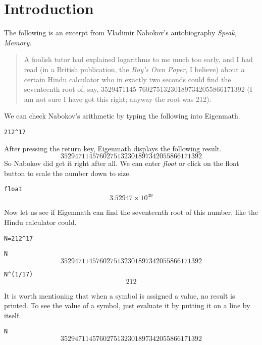 \section{Introduction}

\noindent
The following is an excerpt from Vladimir Nabokov's
autobiography {\it Speak, Memory.}
\begin{quote}
A foolish tutor had explained logarithms to me much too early, and I had
read (in a British publication, the {\it Boy's Own Paper}, I believe)
about a certain Hindu calculator who in exactly two seconds could find the
seventeenth root of, say,
3529471145 760275132301897342055866171392
(I am not sure I have got this right; anyway the root was 212).
\end{quote}
We can check Nabokov's arithmetic by typing the following into Eigenmath.

\medskip
\verb$212^17$

\medskip
\noindent
After pressing the return key, Eigenmath displays the following result.
$$3529471145760275132301897342055866171392$$
So Nabokov did get it right after all.
We can enter {\it float} or click on the float button to scale the number
down to size.

\medskip
\verb$float$
$$3.52947\times10^{39}$$

\medskip
\noindent
Now let us see if Eigenmath can find the
seventeenth root of this number, like the Hindu calculator could.

\medskip
\verb$N=212^17$

\verb$N$
$$3529471145760275132301897342055866171392$$

\verb$N^(1/17)$
$$212$$

\medskip
\noindent
It is worth mentioning that when a symbol is assigned a value,
no result is printed.
To see the value of a symbol, just evaluate it by putting it on a line by
itself.

\medskip
\verb$N$
$$3529471145760275132301897342055866171392$$

